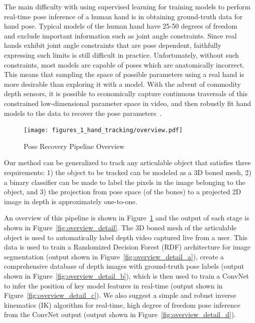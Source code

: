 The main difficulty with using supervised learning for training models to perform real-time pose inference of a human hand is in obtaining ground-truth data for hand pose. Typical models of the human hand have 25-50 degrees of freedom ~\cite{erol2007vision} and exclude important information such as joint angle constraints. Since real hands exhibit joint angle constraints that are pose dependent, faithfully expressing such limits is still difficult in practice. Unfortunately, without such constraints, most models are capable of poses which are anatomically incorrect. This means that sampling the space of possible parameters using a real hand is more desirable than exploring it with a model. With the advent of commodity depth sensors, it is possible to economically capture continuous traversals of this constrained low-dimensional parameter space in video, and then robustly fit hand models to the data to recover the pose parameters~\cite{bmvc2011oikonom}.

\begin{figure}[ht]
\centering
\texttt{[image: figures\_1\_hand\_tracking/overview.pdf]}
    \caption{Pose Recovery Pipeline Overview}
    \label{fig:overview}
\end{figure}

Our method can be generalized to track any articulable object that satisfies three requirements: 1) the object to be tracked can be modeled as a 3D boned mesh, 2) a binary classifier can be made to label the pixels in the image belonging to the object, and 3) the projection from pose space (of the bones) to a projected 2D image in depth is approximately one-to-one. 

An overview of this pipeline is shown in Figure~\ref{fig:overview} and the output of each stage is shown in Figure~\ref{fig:overview_detail}. The 3D boned mesh of the articulable object is used to automatically label depth video captured live from a user. This data is used to train a Randomized Decision Forest (RDF) architecture for image segmentation (output shown in Figure~\ref{fig:overview_detail_a}), create a comprehensive database of depth images with ground-truth pose labels (output shown in Figure~\ref{fig:overview_detail_b}), which is then used to train a ConvNet to infer the position of key model features in real-time (output shown in Figure~\ref{fig:overview_detail_c}). We also suggest a simple and robust inverse kinematics (IK) algorithm for real-time, high degree of freedom pose inference from the ConvNet output (output shown in Figure~\ref{fig:overview_detail_d}). 

